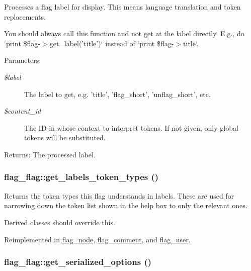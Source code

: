 Processes a flag label for display. This means language translation and token replacements.

You should always call this function and not get at the label directly. E.g., do `print \$flag-$>$get\_\-label('title')` instead of `print \$flag-$>$title`.

\begin{Desc}
\item[Parameters:]
\begin{description}
\item[{\em \$label}]The label to get, e.g. 'title', 'flag\_\-short', 'unflag\_\-short', etc. \item[{\em \$content\_\-id}]The ID in whose context to interpret tokens. If not given, only global tokens will be substituted. \end{description}
\end{Desc}
\begin{Desc}
\item[Returns:]The processed label. \end{Desc}
\hypertarget{classflag__flag_bc21f4a879072d1a9d36b352e9ac6be0}{
\subsubsection[{get\_\-labels\_\-token\_\-types}]{\setlength{\rightskip}{0pt plus 5cm}flag\_\-flag::get\_\-labels\_\-token\_\-types ()}}
\label{classflag__flag_bc21f4a879072d1a9d36b352e9ac6be0}


Returns the token types this flag understands in labels. These are used for narrowing down the token list shown in the help box to only the relevant ones.

Derived classes should override this. 

Reimplemented in \hyperlink{classflag__node_22f752cd73a076e6a36c76b6950e139f}{flag\_\-node}, \hyperlink{classflag__comment_9f6744e13e425967435db592d30cba69}{flag\_\-comment}, and \hyperlink{classflag__user_08790af167b1f4b273b5b8af7d3677b7}{flag\_\-user}.\hypertarget{classflag__flag_b8713b708b7baf409dc9e7308d32a32c}{
\subsubsection[{get\_\-serialized\_\-options}]{\setlength{\rightskip}{0pt plus 5cm}flag\_\-flag::get\_\-serialized\_\-options ()}}
\label{classflag__flag_b8713b708b7baf409dc9e7308d32a32c}


